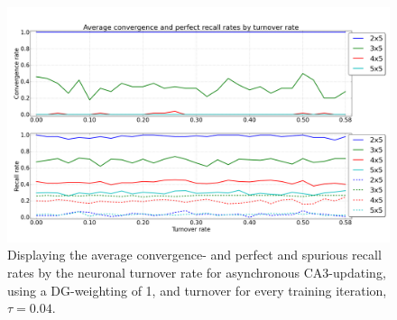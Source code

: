 \begin{figure}
    \centering
    \includegraphics[width=13cm]{fig/turnover_rates/async_tm1_dgw1}
    \caption{Displaying the average convergence- and perfect and spurious recall rates by the neuronal turnover rate for asynchronous CA3-updating, using a DG-weighting of 1, and turnover for every training iteration, $\tau=0.04$.}
    \label{fig:async_tm1_dgw1}
\end{figure}
